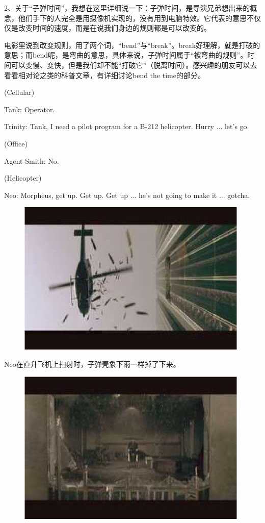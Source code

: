 \documentclass[UTF8]{ctexart}
\newenvironment{myquote}{\color{green} \setlength{\leftskip}{6em} \setlength{\rightskip}{4em} \setlength{\parindent}{-2em}}{\par}
\begin{document}
2、关于“子弹时间”，我想在这里详细说一下：子弹时间，是导演兄弟想出来的概念，他们手下的人完全是用摄像机实现的，没有用到电脑特效。它代表的意思不仅仅是改变时间的速度，而是在说我们身边的规则都是可以改变的。

电影里说到改变规则，用了两个词，“bend”与“break”。break好理解，就是打破的意思；而bend呢，是弯曲的意思，具体来说，子弹时间属于“被弯曲的规则”。时间可以变慢、变快，但是我们却不能“打破它”（脱离时间）。感兴趣的朋友可以去看看相对论之类的科普文章，有详细讨论bend the time的部分。

\begin{myquote}
(Cellular)

Tank: Operator.

Trinity: Tank, I need a pilot program for a B-212 helicopter. Hurry ... let's go.

(Office)

Agent Smith: No.

(Helicopter)

Neo: Morpheus, get up. Get up. Get up ... he's not going to make it ... gotcha.
\end{myquote}

\begin{figure}[htb]
\centering
\includegraphics[width=0.5\linewidth]{fig/read_Matrix-67}
\end{figure}

Neo在直升飞机上扫射时，子弹壳象下雨一样掉了下来。

\begin{figure}[htb]
\centering
\includegraphics[width=0.5\linewidth]{fig/read_Matrix-68}
\end{figure}
\end{document}
